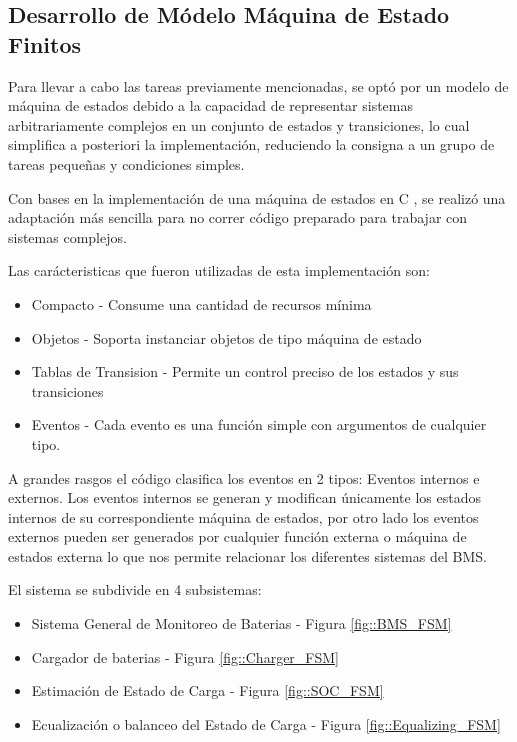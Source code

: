 \documentclass[10pt, a4paper]{report}
\begin{document}
\subsection{Desarrollo de Módelo Máquina de Estado Finitos}

Para llevar a cabo las tareas previamente mencionadas, se opt\'o por un modelo 
de máquina de estados debido a la capacidad de representar sistemas 
arbitrariamente complejos en un conjunto de estados y transiciones, lo cual 
simplifica a posteriori la implementación, reduciendo la consigna a un grupo de 
tareas pequeñas y condiciones simples.

Con bases en la implementación de una máquina de estados en C
\cite{Lafreniere2019}, se realizó una adaptación más sencilla para no correr
código preparado para trabajar con sistemas complejos.

Las carácteristicas que fueron utilizadas de esta implementación son:

\begin{itemize}
	\item Compacto - Consume una cantidad de recursos mínima
	\item Objetos - Soporta instanciar objetos de tipo máquina de estado
	\item Tablas de Transision - Permite un control preciso de los estados y sus 
        transiciones
	\item Eventos - Cada evento es una función simple con argumentos de 
        cualquier tipo.
	\end{itemize}

A grandes rasgos el código clasifica los eventos en 2 tipos: Eventos internos e 
externos. Los eventos internos se generan y modifican únicamente los estados 
internos de su correspondiente máquina de estados, por otro lado los eventos 
externos pueden ser generados por cualquier función externa o máquina de estados 
externa lo que nos permite relacionar los diferentes sistemas del BMS.

El sistema se subdivide en 4 subsistemas:

\begin{itemize}
    \item Sistema General de Monitoreo de Baterias - Figura \ref{fig::BMS_FSM}
    \item Cargador de baterias - Figura \ref{fig::Charger_FSM}
    \item Estimación de Estado de Carga - Figura \ref{fig::SOC_FSM}
    \item Ecualización o balanceo del Estado de Carga - Figura
        \ref{fig::Equalizing_FSM}
\end{itemize}
\end{document}
